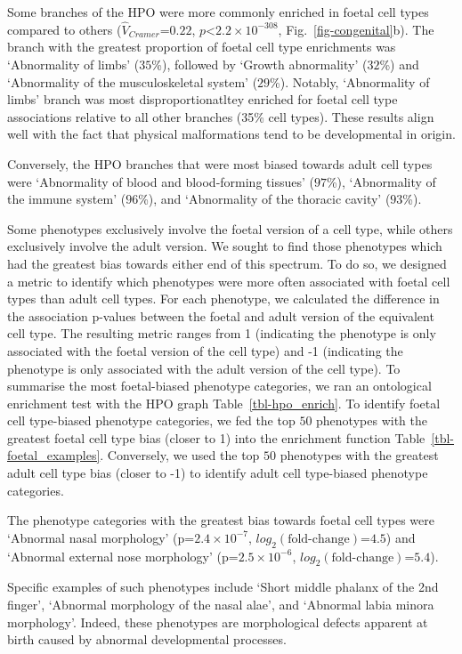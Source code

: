 \documentclass[
]{article}
\begin{document}
Some branches of the HPO were more commonly enriched in foetal cell
types compared to others (\(\hat{V}_{Cramer}\)=\(0.22\),
\(p\)\textless{}\(2.2 \times 10^{-308}\), Fig.~\ref{fig-congenital}b).
The branch with the greatest proportion of foetal cell type enrichments
was `Abnormality of limbs' (\(35\)\%), followed by `Growth abnormality'
(\(32\)\%) and `Abnormality of the musculoskeletal system' (\(29\)\%).
Notably, `Abnormality of limbs' branch was most disproportionatltey
enriched for foetal cell type associations relative to all other
branches (35\% cell types). These results align well with the fact that
physical malformations tend to be developmental in origin.

Conversely, the HPO branches that were most biased towards adult cell
types were `Abnormality of blood and blood-forming tissues' (\(97\)\%),
`Abnormality of the immune system' (\(96\)\%), and `Abnormality of the
thoracic cavity' (\(93\)\%).

Some phenotypes exclusively involve the foetal version of a cell type,
while others exclusively involve the adult version. We sought to find
those phenotypes which had the greatest bias towards either end of this
spectrum. To do so, we designed a metric to identify which phenotypes
were more often associated with foetal cell types than adult cell types.
For each phenotype, we calculated the difference in the association
p-values between the foetal and adult version of the equivalent cell
type. The resulting metric ranges from 1 (indicating the phenotype is
only associated with the foetal version of the cell type) and -1
(indicating the phenotype is only associated with the adult version of
the cell type). To summarise the most foetal-biased phenotype
categories, we ran an ontological enrichment test with the HPO graph
Table~\ref{tbl-hpo_enrich}. To identify foetal cell type-biased
phenotype categories, we fed the top \(50\) phenotypes with the greatest
foetal cell type bias (closer to 1) into the enrichment function
Table~\ref{tbl-foetal_examples}. Conversely, we used the top \(50\)
phenotypes with the greatest adult cell type bias (closer to -1) to
identify adult cell type-biased phenotype categories.

The phenotype categories with the greatest bias towards foetal cell
types were `Abnormal nasal morphology' (p=\(2.4 \times 10^{-7}\),
\(log_2(\text{fold-change})\)=\(4.5\)) and `Abnormal external nose
morphology' (p=\(2.5 \times 10^{-6}\),
\(log_2(\text{fold-change})\)=\(5.4\)).

Specific examples of such phenotypes include `Short middle phalanx of
the 2nd finger', `Abnormal morphology of the nasal alae', and `Abnormal
labia minora morphology'. Indeed, these phenotypes are morphological
defects apparent at birth caused by abnormal developmental processes.
\end{document}
